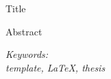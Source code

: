 \begin{description}[leftmargin=3.2cm,font=\normalfont]
\item[Title of the thesis:] Title
\end{description}

Abstract



\vspace{0.025\textheight}
\textit{Keywords:}\\
\textit{template, LaTeX, thesis}